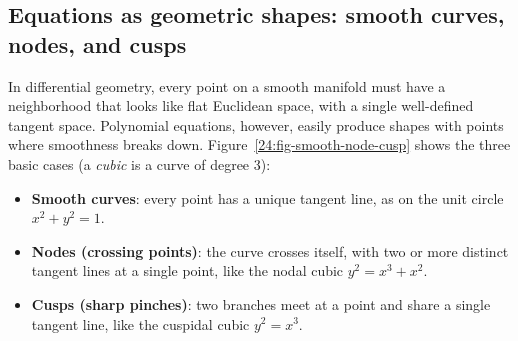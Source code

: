 \subsection{Equations as geometric shapes: smooth curves, nodes, and cusps}

In differential geometry, every point on a smooth manifold must have a neighborhood that looks like flat Euclidean space, with a single well-defined tangent space. Polynomial equations, however, easily produce shapes with points where smoothness breaks down. Figure~\ref{24:fig-smooth-node-cusp} shows the three basic cases (a \emph{cubic} is a curve of degree 3):
\begin{itemize}
\item \textbf{Smooth curves}: every point has a unique tangent line, as on the unit circle $x^2 + y^2 = 1$.
\item \textbf{Nodes (crossing points)}: the curve crosses itself, with two or more distinct tangent lines at a single point, like the nodal cubic $y^2 = x^3 + x^2$.
\item \textbf{Cusps (sharp pinches)}: two branches meet at a point and share a single tangent line, like the cuspidal cubic $y^2 = x^3$.
\end{itemize}

